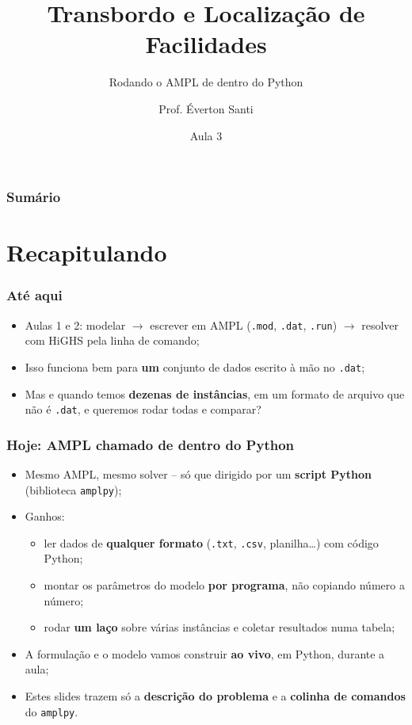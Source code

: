 \documentclass[fleqn]{beamer}
\title[Aula 3 -- AMPL + Python]{Transbordo e Localização de Facilidades}
\subtitle{Rodando o AMPL de dentro do Python}
\author[Santi]{Prof. \'Everton Santi}
\institute[UFRN/ECT]{ECT2524 -- Introdução à Otimização \\ Escola de Ciências e Tecnologia -- UFRN}
\date{Aula 3}
\begin{document}
\begin{frame}
	\titlepage
\end{frame}

\begin{frame}
	\frametitle{Sumário}
	\tableofcontents
\end{frame}

\section{Recapitulando}

\begin{frame}
	\frametitle{Até aqui}
	\begin{itemize}
		\item Aulas 1 e 2: modelar $\rightarrow$ escrever em AMPL
			(\texttt{.mod}, \texttt{.dat}, \texttt{.run}) $\rightarrow$
			resolver com HiGHS pela linha de comando;
		\item Isso funciona bem para \textbf{um} conjunto de dados escrito
			à mão no \texttt{.dat};
		\item Mas e quando temos \textbf{dezenas de instâncias}, em um
			formato de arquivo que não é \texttt{.dat}, e queremos rodar
			todas e comparar?
	\end{itemize}
\end{frame}

\begin{frame}
	\frametitle{Hoje: AMPL chamado de dentro do Python}
	\begin{itemize}
		\item Mesmo AMPL, mesmo solver -- só que dirigido por um
			\textbf{script Python} (biblioteca \texttt{amplpy});
		\item Ganhos:
		\begin{itemize}
			\item ler dados de \textbf{qualquer formato} (\texttt{.txt},
				\texttt{.csv}, planilha\dots) com código Python;
			\item montar os parâmetros do modelo \textbf{por programa},
				não copiando número a número;
			\item rodar \textbf{um laço} sobre várias instâncias e
				coletar resultados numa tabela;
		\end{itemize}
		\item A formulação e o modelo vamos construir \textbf{ao vivo},
			em Python, durante a aula;
		\item Estes slides trazem só a \textbf{descrição do problema} e a
			\textbf{colinha de comandos} do \texttt{amplpy}.
	\end{itemize}
\end{frame}
\end{document}
